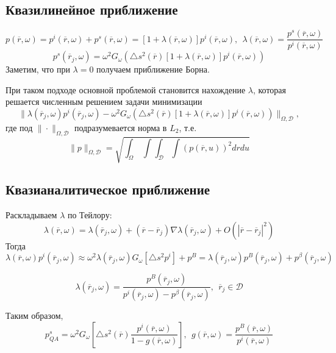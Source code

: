 \documentclass[a4paper,14pt]{article}
\theoremstyle{plain} %
\theoremstyle{definition} %
\theoremstyle{remark} %
\renewcommand{\r}{\ensuremath{\overline{r}}}
\begin{document}
 	\subsection{Квазилинейное приближение}
 	$$p(\r, \omega) = p^i(\r, \omega) + p^s(\r, \omega)=\left[1 + \lambda(\r, \omega)\right]p^i(\r, \omega),\ \ \lambda(\r, \omega) = \dfrac{p^s(\r, \omega)}{p^i(\r, \omega)}$$
 	$$p^s(\r_j, \omega) = \omega^2G_\omega\left(\triangle s^2(\r)\left[1+\lambda(\r, \omega)\right]p^i(\r, \omega)\right)$$
 	Заметим, что при $\lambda  = 0$ получаем приближение Борна.
 	
 	При таком подходе основной проблемой становится нахождение $\lambda$, которая решается численным решением задачи минимизации
 	$$\|\lambda(\r_j, \omega)p^i(\r_j, \omega) - \omega^2G_\omega\left(\triangle s^2(\r)\left[1+ \lambda(\r, \omega)\right]p^i(\r, \omega)\right)\|_{\Omega, \mathcal{D}},$$
 	где под $\|\cdot\|_{\Omega, \mathcal{D}}$ подразумевается норма в $L_2$, т.е. 
 	$$\|p\|_{\Omega, \mathcal{D}} = \sqrt{\int_{\Omega}\ \int\int_\mathcal{D}\int (p(\r, u))^2drdu}$$
 	
 	\subsection{Квазианалитическое приближение}
 	Раскладываем $\lambda$ по Тейлору:
 	$$\lambda(\r, \omega) = \lambda(\r_j, \omega) + (\r - \r_j)\nabla\lambda(\r_j, \omega) + O(|\r - \r_j|^2)$$
 	Тогда
 	$$\lambda(\r, \omega)p^i(\r_j, \omega) \approx \omega^2 \lambda(\r_j,\omega)G_\omega\left[\triangle s^2p^i\right] + p^B = \lambda(\r_j, \omega)p^B(\r_j, \omega) + p^\beta(\r_j, \omega)$$
 	
 	$$\lambda(\r_j, \omega) = \dfrac{p^B(\r_j, \omega)}{p^i(\r_j, \omega) - p^\beta(\r_j, \omega)}, \ \ \r_j \in \mathcal{D}$$
 	
 	Таким образом,
 	$$p^s_{QA} = \omega^2 G_\omega\left[\triangle s^2(\r)\dfrac{p^i(\r, \omega)}{1-g(\r, \omega)}\right], \ \ g(\r, \omega) = \dfrac{p^B(\r, \omega)}{p^i(\r, \omega)}$$
 	
\end{document}
